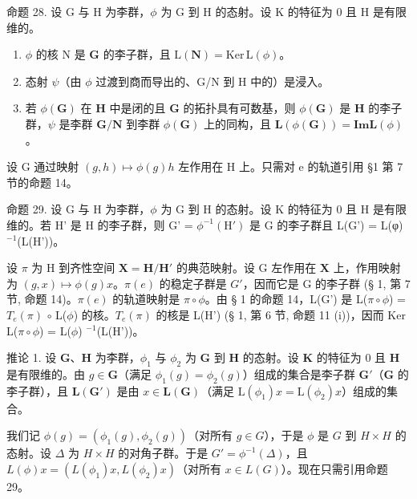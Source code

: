 命题 28. 设 G 与 H 为李群，\(\phi\) 为 G 到 H 的态射。设 K 的特征为 0 且 H 是有限维的。

\begin{enumerate}
\def\labelenumi{(\roman{enumi})}
\item
  \(\phi\) 的核 N 是 \(\mathbf{G}\) 的李子群，且 \(\mathrm{L}(\mathbf{N}) = \mathrm{Ker} \, \mathrm{L}(\phi)\)。
\item
  态射 \(\psi\)（由 \(\phi\) 过渡到商而导出的、G/N 到 H 中的）是浸入。
\item
  若 \(\phi(\mathbf{G})\) 在 \(\mathbf{H}\) 中是闭的且 \(\mathbf{G}\) 的拓扑具有可数基，则 \(\phi(\mathbf{G})\) 是 \(\mathbf{H}\) 的李子群，\(\psi\) 是李群 \(\mathbf{G}/\mathbf{N}\) 到李群 \(\phi(\mathbf{G})\) 上的同构，且 \(\mathbf{L}(\phi(\mathbf{G})) = \mathbf{Im} \mathbf{L}(\phi)\)。
\end{enumerate}

设 G 通过映射 \((g, h) \mapsto \phi(g)h\) 左作用在 H 上。只需对 e 的轨道引用 §1 第 7 节的命题 14。

命题 29. 设 G 与 H 为李群，\(\phi\) 为 G 到 H 的态射。设 K 的特征为 0 且 H 是有限维的。若 H' 是 H 的李子群，则 G' = \(\phi^{-1}(\mathrm{H}')\) 是 G 的李子群且 L(G') = L(φ)\(^{-1}\)(L(H'))。

设 \(\pi\) 为 H 到齐性空间 \(\mathbf{X} = \mathbf{H} / \mathbf{H}'\) 的典范映射。设 G 左作用在 \(\mathbf{X}\) 上，作用映射为 \((g, x) \mapsto \phi(g)x\)。\(\pi(e)\) 的稳定子群是 \(G'\)，因而它是 G 的李子群 (§ 1, 第 7 节, 命题 14)。\(\pi(e)\) 的轨道映射是 \(\pi \circ \phi\)。由 § 1 的命题 14，L(G') 是 L(\(\pi \circ \phi\)) = \(T_e(\pi)\) \(\circ\) L(\(\phi\)) 的核。\(T_e(\pi)\) 的核是 L(H') (§ 1, 第 6 节, 命题 11 (i))，因而 Ker L(\(\pi \circ \phi\)) = L(\(\phi\)) \(^{-1}\)(L(H'))。

推论 1. 设 \(\mathbf{G}\)、\(\mathbf{H}\) 为李群，\(\phi_1\) 与 \(\phi_2\) 为 \(\mathbf{G}\) 到 \(\mathbf{H}\) 的态射。设 \(\mathbf{K}\) 的特征为 0 且 \(\mathbf{H}\) 是有限维的。由 \(g \in \mathbf{G}\)（满足 \(\phi_1(g) = \phi_2(g)\)）组成的集合是李子群 \(\mathbf{G}'\)（\(\mathbf{G}\) 的李子群），且 \(\mathbf{L}(\mathbf{G}')\) 是由 \(x \in \mathbf{L}(\mathbf{G})\)（满足 \(\mathrm{L}(\phi_1)x = \mathrm{L}(\phi_2)x\)）组成的集合。

我们记 \(\phi(g) = (\phi_1(g), \phi_2(g))\)（对所有 \(g \in G\)），于是 \(\phi\) 是 \(G\) 到 \(H \times H\) 的态射。设 \(\Delta\) 为 \(H \times H\) 的对角子群。于是 \(G' = \phi^{-1}(\Delta)\)，且 \(L(\phi)x = (L(\phi_1)x, L(\phi_2)x)\)（对所有 \(x \in L(G)\)）。现在只需引用命题 29。

